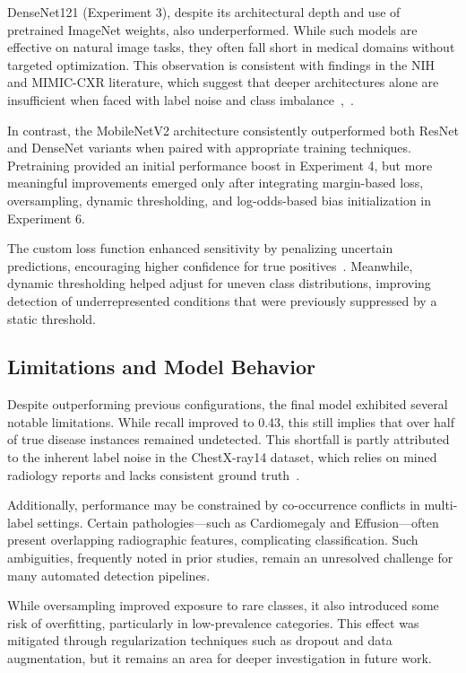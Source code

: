 \documentclass[12pt]{article}
\begin{document}
\begin{multicols}{2}
DenseNet121 (Experiment 3), despite its architectural depth and use of pretrained ImageNet weights, also underperformed. While such models are effective on natural image tasks, they often fall short in medical domains without targeted optimization. This observation is consistent with findings in the NIH and MIMIC-CXR literature, which suggest that deeper architectures alone are insufficient when faced with label noise and class imbalance~\cite{wang2017chestx},~\cite{johnson2019mimic}.

In contrast, the MobileNetV2 architecture consistently outperformed both ResNet and DenseNet variants when paired with appropriate training techniques. Pretraining provided an initial performance boost in Experiment 4, but more meaningful improvements emerged only after integrating margin-based loss, oversampling, dynamic thresholding, and log-odds-based bias initialization in Experiment 6.

The custom loss function enhanced sensitivity by penalizing uncertain predictions, encouraging higher confidence for true positives~\cite{13}. Meanwhile, dynamic thresholding helped adjust for uneven class distributions, improving detection of underrepresented conditions that were previously suppressed by a static threshold.

\subsection{Limitations and Model Behavior}
Despite outperforming previous configurations, the final model exhibited several notable limitations. While recall improved to 0.43, this still implies that over half of true disease instances remained undetected. This shortfall is partly attributed to the inherent label noise in the ChestX-ray14 dataset, which relies on mined radiology reports and lacks consistent ground truth~\cite{wang2017chestx}.

Additionally, performance may be constrained by co-occurrence conflicts in multi-label settings. Certain pathologies—such as Cardiomegaly and Effusion—often present overlapping radiographic features, complicating classification. Such ambiguities, frequently noted in prior studies, remain an unresolved challenge for many automated detection pipelines.

While oversampling improved exposure to rare classes, it also introduced some risk of overfitting, particularly in low-prevalence categories. This effect was mitigated through regularization techniques such as dropout and data augmentation, but it remains an area for deeper investigation in future work.


\end{multicols}
\end{document}
